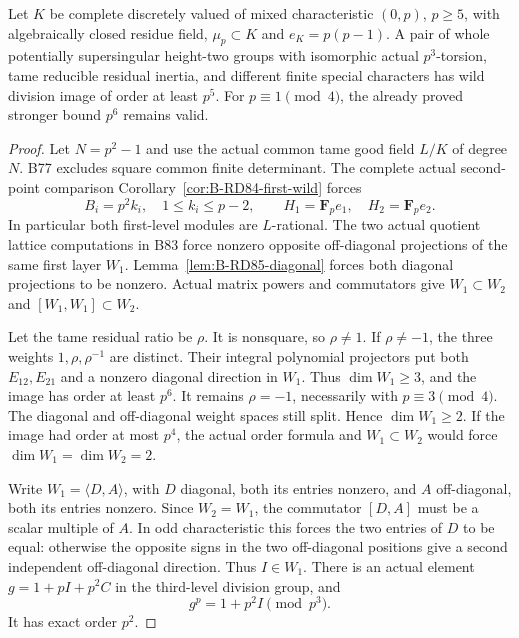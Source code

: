 \begin{proposition}
\label{prop:B-RD102-tame}
Let $K$ be complete discretely valued of mixed
characteristic $(0,p)$, $p\ge5$, with algebraically
closed residue field, $\mu_p\subset K$ and
$e_K=p(p-1)$. A pair of whole potentially supersingular
height-two groups with isomorphic actual $p^3$-torsion,
tame reducible residual inertia, and different finite
special characters has wild division image of order
at least $p^5$.
For $p\equiv1\pmod4$, the already proved stronger
bound $p^6$ remains valid.
\end{proposition}
\begin{proof}
Let $N=p^2-1$ and use the actual common tame good
field $L/K$ of degree $N$.
B77 excludes square common finite determinant.
The complete actual second-point comparison
Corollary~\ref{cor:B-RD84-first-wild} forces
\[
 B_i=p^2k_i,\quad1\le k_i\le p-2,\qquad
 H_1=\mathbf F_pe_1,\quad H_2=\mathbf F_pe_2 .
                                                        \tag{B-RD102.6}
\]
In particular both first-level modules are $L$-rational.
The two actual quotient lattice computations in B83
force nonzero opposite off-diagonal projections of
the same first layer $W_1$. Lemma~\ref{lem:B-RD85-diagonal}
forces both diagonal projections to be nonzero.
Actual matrix powers and commutators give
$W_1\subset W_2$ and $[W_1,W_1]\subset W_2$.

Let the tame residual ratio be $\rho$.
It is nonsquare, so $\rho\ne1$. If $\rho\ne-1$,
the three weights $1,\rho,\rho^{-1}$ are distinct.
Their integral polynomial projectors put both
$E_{12},E_{21}$ and a nonzero diagonal direction
in $W_1$. Thus $\dim W_1\ge3$, and the image has
order at least $p^6$.
It remains $\rho=-1$, necessarily with
$p\equiv3\pmod4$. The diagonal and off-diagonal
weight spaces still split. Hence $\dim W_1\ge2$.
If the image had order at most $p^4$, the actual
order formula and $W_1\subset W_2$ would force
$\dim W_1=\dim W_2=2$.

Write $W_1=\langle D,A\rangle$, with $D$ diagonal,
both its entries nonzero, and $A$ off-diagonal,
both its entries nonzero. Since $W_2=W_1$,
the commutator $[D,A]$ must be a scalar multiple
of $A$. In odd characteristic this forces the two
entries of $D$ to be equal: otherwise the opposite
signs in the two off-diagonal positions give a second
independent off-diagonal direction.
Thus $I\in W_1$. There is an actual element
$g=1+pI+p^2C$ in the third-level division group,
and
\[
                     g^p=1+p^2I\pmod{p^3}.
                                                        \tag{B-RD102.7}
\]
It has exact order $p^2$.


\end{proof}
